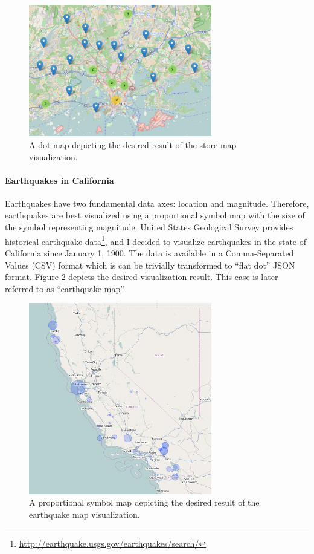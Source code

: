 \begin{figure}[htbp]
  \begin{center}
    \includegraphics[width=8cm]{images/dotmap-example-thematic.png}
    \caption{A dot map depicting the desired result of the store map visualization.}
    \label{fig:storemapresult}
  \end{center}
\end{figure}

\paragraph{Earthquakes in California}
Earthquakes have two fundamental data axes: location and magnitude. Therefore, earthquakes are best visualized using a proportional symbol map with the size of the symbol representing magnitude. United States Geological Survey provides historical earthquake data\footnote{\url{http://earthquake.usgs.gov/earthquakes/search/}}, and I decided to visualize earthquakes in the state of California since January 1, 1900. The data is available in a Comma-Separated Values (CSV) format which is can be trivially transformed to ``flat dot'' JSON format. Figure \ref{fig:quakemapresult} depicts the desired visualization result. This case is later referred to as ``earthquake map''.

\begin{figure}[htbp]
  \begin{center}
    \includegraphics[width=8cm]{images/proportionalsymbol-example-thematic.png}
    \caption{A proportional symbol map depicting the desired result of the earthquake map visualization.}
    \label{fig:quakemapresult}
  \end{center}
\end{figure}

